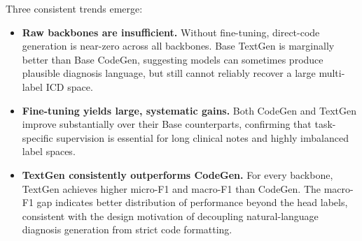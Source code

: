 Three consistent trends emerge:
\begin{itemize}
    \item \textbf{Raw backbones are insufficient.} Without fine-tuning, direct-code generation is near-zero across all backbones. Base TextGen is marginally better than Base CodeGen, suggesting models can sometimes produce plausible diagnosis language, but still cannot reliably recover a large multi-label ICD space.
    \item \textbf{Fine-tuning yields large, systematic gains.} Both CodeGen and TextGen improve substantially over their Base counterparts, confirming that task-specific supervision is essential for long clinical notes and highly imbalanced label spaces.
    \item \textbf{TextGen consistently outperforms CodeGen.} For every backbone, TextGen achieves higher micro-F1 and macro-F1 than CodeGen. The macro-F1 gap indicates better distribution of performance beyond the head labels, consistent with the design motivation of decoupling natural-language diagnosis generation from strict code formatting.
\end{itemize}

